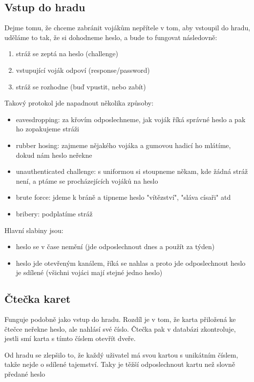 \subsection{Vstup do hradu}

Dejme tomu, že chceme zabránit vojákům nepřítele v tom, aby vstoupil do hradu, uděláme to tak, že si dohodneme heslo, a bude to fungovat následovně:
\begin{enumerate}
\item stráž se zeptá na heslo (challenge)
\item vstupující voják odpoví (response/password)
\item stráž se rozhodne (buď vpustit, nebo zabít)
\end{enumerate}

Takový protokol jde napadnout několika způsoby:
\begin{itemize}
\item eavesdropping: za křovím odposlechneme, jak voják říká správné heslo a pak ho zopakujeme stráži
\item rubber hosing: zajmeme nějakého vojáka a gumovou hadicí ho mlátíme, dokud nám heslo neřekne
\item unauthenticated challenge: s uniformou si stoupneme někam, kde žádná stráž není, a ptáme se procházejících vojáků na heslo
\item brute force: jdeme k bráně a tipneme heslo "vítězství", "sláva císaři" atd
\item bribery: podplatíme stráž
\end{itemize}

Hlavní slabiny jsou:
\begin{itemize}
\item heslo se v čase nemění (jde odposlechnout dnes a použít za týden)
\item heslo jde otevřeným kanálem, říká se nahlas a proto jde odposlechnout
heslo je sdílené (všichni vojáci mají stejné jedno heslo)
\end{itemize}

\subsection{Čtečka karet}

Funguje podobně jako vstup do hradu. Rozdíl je v tom, že karta přiložená ke čtečce neřekne heslo, ale nahlásí své číslo. Čtečka pak v databázi zkontroluje, jestli smí karta s tímto číslem otevřít dveře.

Od hradu se zlepšilo to, že každý uživatel má svou kartou s unikátním číslem, takže nejde o sdílené tajemství. Taky je těžší odposlechnout kartu než slovně předané heslo

